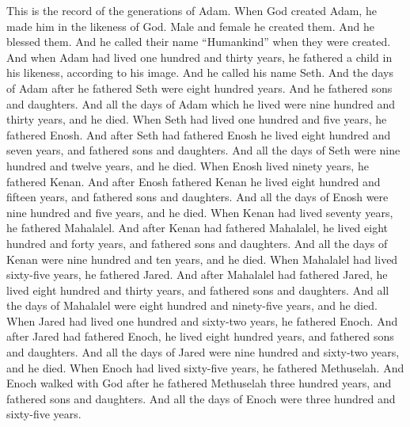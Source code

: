\begin{biblechapter} %
 This is the record of the generations of Adam. When God created Adam, he made him in the likeness of God.
\verse Male and female he created them. And he blessed them. And he called their name “Humankind” when they were created.
\verse And when Adam had lived one hundred and thirty years, he fathered a child in his likeness, according to his image. And he called his name Seth.
\verse And the days of Adam after he fathered Seth were eight hundred years. And he fathered sons and daughters.
\verse And all the days of Adam which he lived were nine hundred and thirty years, and he died.
\verse When Seth had lived one hundred and five years, he fathered Enosh.
\verse And after Seth had fathered Enosh he lived eight hundred and seven years, and fathered sons and daughters.
\verse And all the days of Seth were nine hundred and twelve years, and he died.
\verse When Enosh lived ninety years, he fathered Kenan.
\verse And after Enosh fathered Kenan he lived eight hundred and fifteen years, and fathered sons and daughters.
\verse And all the days of Enosh were nine hundred and five years, and he died.
\verse When Kenan had lived seventy years, he fathered Mahalalel.
\verse And after Kenan had fathered Mahalalel, he lived eight hundred and forty years, and fathered sons and daughters.
\verse And all the days of Kenan were nine hundred and ten years, and he died.
\verse When Mahalalel had lived sixty-five years, he fathered Jared.
\verse And after Mahalalel had fathered Jared, he lived eight hundred and thirty years, and fathered sons and daughters.
\verse And all the days of Mahalalel were eight hundred and ninety-five years, and he died.
\verse When Jared had lived one hundred and sixty-two years, he fathered Enoch.
\verse And after Jared had fathered Enoch, he lived eight hundred years, and fathered sons and daughters.
\verse And all the days of Jared were nine hundred and sixty-two years, and he died.
\verse When Enoch had lived sixty-five years, he fathered Methuselah.
\verse And Enoch walked with God after he fathered Methuselah three hundred years, and fathered sons and daughters.
\verse And all the days of Enoch were three hundred and sixty-five years.

\end{biblechapter}
